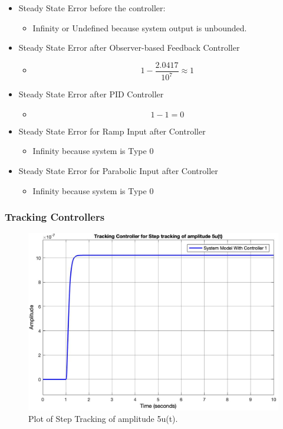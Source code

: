 \documentclass{article}
\begin{document}
\begin{itemize}
\item Steady State Error before the controller:
\begin{itemize}
\item Infinity or Undefined because system output is unbounded. 
\end{itemize}

\item Steady State Error after Observer-based Feedback Controller
\begin{itemize}
\item  \begin{equation}
1 - \frac{2.0417}{10^7}\approx 1
\end{equation}
\end{itemize}

\item Steady State Error after PID Controller
\begin{itemize}
\item \begin{equation}
1 - 1 = 0 
\end{equation}
\end{itemize}
\end{itemize}
\begin{itemize}
\item Steady State Error for Ramp Input after Controller
\begin{itemize}
\item Infinity because system is Type 0
\end{itemize}
\item Steady State Error for Parabolic Input after Controller
\begin{itemize}
\item Infinity because system is Type 0
\end{itemize}
\end{itemize}

\subsubsection{Tracking Controllers}
\begin{figure}[h!]
\centering
\includegraphics[scale=0.25]{Steptracking.jpg}
\caption{Plot of Step Tracking of amplitude 5u(t).}
\end{figure}
\end{document}
